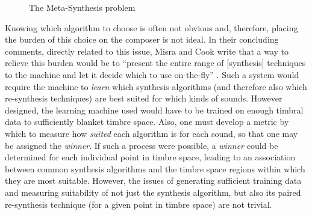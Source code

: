 \documentclass[12pt]{report} 	%
\numberwithin{figure}{chapter}
\numberwithin{table}{chapter}
\numberwithin{equation}{chapter}
\begin{document}
\begin{flushleft}
\begin{figure}[h!]
\begin{center}
\caption[The meta-synthesis problem]{The Meta-Synthesis problem}
\end{center}
\end{figure}
Knowing which algorithm to choose is often not obvious and, therefore, placing the burden of this choice on the composer is not ideal. In their concluding comments, directly related to this issue, Misra and Cook write that a way to relieve this burden would be to ``present the entire range of [synthesis] techniques to the machine and let it decide which to use on-the-fly''  \cite[p. 5]{Misra:2009km}. Such a system would require the machine to \textit{learn} which synthesis algorithms (and therefore also which re-synthesis techniques) are best suited for which kinds of sounds. However designed, the learning machine used would have to be trained on enough timbral data to sufficiently blanket timbre space. Also, one must develop a metric by which to measure how \textit{suited} each algorithm is for each sound, so that one may be assigned the \textit{winner}. If such a process were possible, a \textit{winner} could be determined for each individual point in timbre space, leading to an association between common synthesis algorithms and the timbre space regions within which they are most suitable. However, the issues of generating sufficient training data and measuring suitability of not just the synthesis algorithm, but also its paired re-synthesis technique (for a given point in timbre space) are not trivial.


\end{flushleft}
\end{document}

